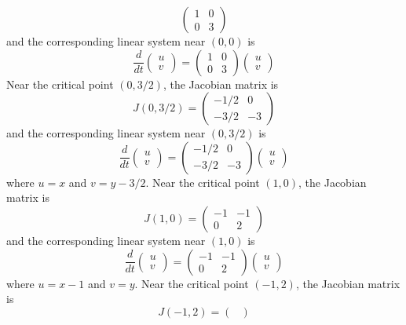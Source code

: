 \documentclass[11pt,a4paper]{article}
\begin{document}
\begin{enumerate}
$$\begin{pmatrix}
			1 & 0\\
			0 & 3
		\end{pmatrix}
		$$
		and the corresponding linear system near $(0, 0)$ is
		$$
		\frac{d}{dt}
		\begin{pmatrix}
			u\\
			v
		\end{pmatrix} =
		\begin{pmatrix}
			1 & 0\\
			0 & 3
		\end{pmatrix}
		\begin{pmatrix}
			u\\
			v
		\end{pmatrix}
		$$
		Near the critical point $(0, 3/2)$, the Jacobian matrix is
		$$
		J(0, 3/2) =
		\begin{pmatrix}
			-1/2 & 0\\
			-3/2 & -3
		\end{pmatrix}
		$$
		and the corresponding linear system near $(0, 3/2)$ is
		$$
		\frac{d}{dt}
		\begin{pmatrix}
			u\\
			v
		\end{pmatrix} =
		\begin{pmatrix}
			-1/2 & 0\\
			-3/2 & -3
		\end{pmatrix}
		\begin{pmatrix}
			u\\
			v
		\end{pmatrix}
		$$
		where $u = x$ and $v = y - 3/2$. Near the critical point $(1, 0)$, the Jacobian matrix is
		$$
		J(1, 0) =
		\begin{pmatrix}
			-1 & -1\\
			0 & 2
		\end{pmatrix}
		$$
		and the corresponding linear system near $(1, 0)$ is
		$$
		\frac{d}{dt} 
		\begin{pmatrix}
			u\\
			v
		\end{pmatrix} =
		\begin{pmatrix}
			-1 & -1\\
			0 & 2
		\end{pmatrix}
		\begin{pmatrix}
			u\\
			v
		\end{pmatrix}
		$$
		where $u = x - 1$ and $v = y$. Near the critical point $(-1, 2)$, the Jacobian matrix is
		$$
		J(-1, 2) =
		\begin{pmatrix}

\end{pmatrix}$$
\end{enumerate}
\end{document}
